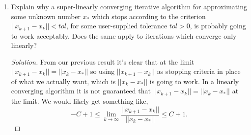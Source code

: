 \documentclass[12pt]{article}
\makeatletter
\theoremstyle{homework}
\newenvironment{exercise}[1]
{\def\@currentlabel{#1}\exercisecore}
{\endexercisecore}
\makeatother
\begin{document}
\begin{exercise}{P15}
\begin{enumerate}
\begin{proof}
    \end{proof}
\vspace{.15in}

    \item[(b)] Explain why a super-linearly converging iterative algorithm for approximating some unknown number $x_*$
    which stops according to the criterion $||x_{k + 1} - x_k|| < tol$, for some user-supplied tolerance $tol> 0$, is probably going to work acceptably. Does
    the same apply to iterations which converge only linearly?
    \begin{proof}[Solution] From our previous result it's clear that at the limit $||x_{k + 1} - x_k|| = ||x_k - x_*||$ so using $||x_{k + 1} - x_k||$ as 
      stopping criteria in place of what we actually want, which is $||x_k - x_*||$ is going to work. In a linearly converging algorithm
      it is not guaranteed that $||x_{k + 1} - x_k|| = ||x_k - x_*||$ at the limit. We would likely get something like, 
      \begin{equation*}
        -C + 1 \leq \lim_{k \to \infty} \frac{||x_{k + 1} - x_k||}{||x_k - x_*||} \leq C + 1.
      \end{equation*}
 
    

    \end{proof}
  \vspace{.15in}


  \end{enumerate}
  \end{exercise}
\vspace{.5in}
\end{document}
